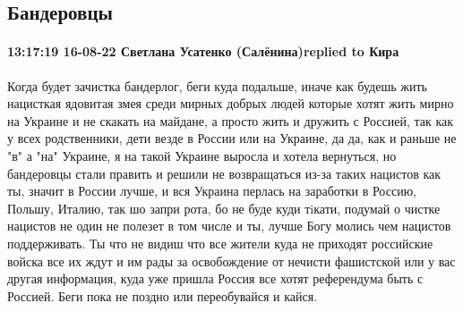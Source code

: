  
 
 
 
 

\subsection{Бандеровцы}

\paragraph{13:17:19 16-08-22 Светлана Усатенко (Салёнина)replied to Кира}

Когда будет зачистка бандерлог, беги куда подальше, иначе как будешь жить
нацисткая ядовитая змея среди мирных добрых людей которые хотят жить мирно на
Украине и не скакать на майдане, а просто жить и дружить с Россией, так как у
всех родственники, дети везде в России или на Украине, да да, как и раньше не
"в" а "на" Украине, я на такой Украине выросла и хотела вернуться, но
бандеровцы стали править и решили не возвращаться из-за таких нацистов как ты,
значит в России лучше, и вся Украина перлась на заработки в Россию, Польшу,
Италию, так шо запри рота, бо не буде куди тiкати, подумай о чистке нацистов не
один не полезет в том числе и ты, лучше Богу молись чем нацистов поддерживать.
Ты что не видиш что все жители куда не приходят российские войска все их ждут и
им рады за освобождение от нечисти фашистской или у вас другая информация, куда
уже пришла Россия все хотят референдума быть с Россией. Беги пока не поздно или
переобувайся и кайся.

